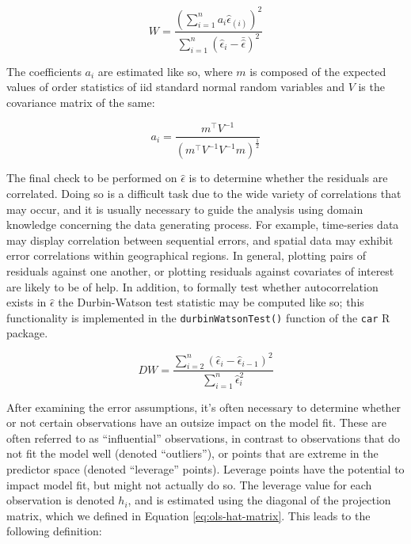 \documentclass{report}
\begin{document}
\begin{equation}\label{eq:ols-shapiro-wilk-stat-1}
    W = \frac{\left(\sum_{i=1}^n a_i \hat{\epsilon}_{(i)}\right)^2}{\sum_{i=1}^n \left(\hat{\epsilon}_i - \bar{\hat{\epsilon}}\right)^2}
\end{equation}

The coefficients $a_i$ are estimated like so, where $m$ is composed of the expected values of order statistics of \gls{iid} standard normal random variables and $V$ is the covariance matrix of the same:

\begin{equation}\label{eq:ols-shapiro-wilk-stat-2}
    a_i = \frac{m^\intercal V^{-1}}{\left(m^\intercal V^{-1}V^{-1}m\right)^{\frac{1}{2}}}
\end{equation}

The final check to be performed on $\hat{\epsilon}$ is to determine whether the residuals are correlated. Doing so is a difficult task due to the wide variety of correlations that may occur, and it is usually necessary to guide the analysis using domain knowledge concerning the data generating process. For example, time-series data may display correlation between sequential errors, and spatial data may exhibit error correlations within geographical regions. In general, plotting pairs of residuals against one another, or plotting residuals against covariates of interest are likely to be of help. In addition, to formally test whether autocorrelation exists in $\hat{\epsilon}$ the Durbin-Watson test statistic may be computed like so; this functionality is implemented in the \texttt{durbinWatsonTest()} function of the \texttt{car} R package. 

\begin{equation}\label{eq:durbin-watson-stat}
    DW = \frac{\sum_{i=2}^n \left(\hat{\epsilon}_i - \hat{\epsilon}_{i-1}\right)^2}{\sum_{i=1}^n \hat{\epsilon}_i^2}
\end{equation}

After examining the error assumptions, it's often necessary to determine whether or not certain observations have an outsize impact on the model fit. These are often referred to as ``influential'' observations, in contrast to observations that do not fit the model well (denoted ``outliers''), or points that are extreme in the predictor space (denoted ``leverage'' points). Leverage points have the potential to impact model fit, but might not actually do so. The leverage value for each observation is denoted $h_i$, and is estimated using the diagonal of the projection matrix, which we defined in Equation \ref{eq:ols-hat-matrix}. This leads to the following definition:
\end{document}
